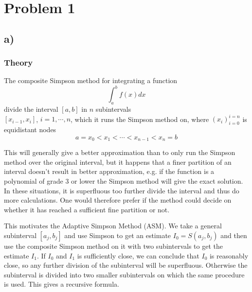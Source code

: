 \documentclass[12pt, a4paper,usenames,dvipsnames]{article}
\begin{document}
\section*{Problem 1}
\subsection*{a)}
\subsubsection*{Theory}
The composite Simpson method for integrating a function 
\[\int_a^bf(x)dx\] 
divide the interval \([a,b]\) in \(n\) subintervals\\ \([x_{i-1},x_i]\), \(i=1,\cdots,n\), which it runs the Simpson method on, where \((x_i)_{i=0}^{i=n}\) is equidistant nodes \[a=x_0<x_1<\cdots<x_{n-1}<x_n=b\]

This will generally give a better approximation than to only run the Simpson method over the original interval, but it happens that a finer partition of an interval doesn't result in better approximation, e.g. if the function is a polynomial of grade 3 or lower the Simpson method will give the exact solution. In these situations, it is superfluous too further divide the interval and thus do more calculations. One would therefore prefer if the method could decide on whether it has reached a sufficient fine partition or not.

This motivates the Adaptive Simpson Method (ASM). We take a general subinterval \([a_j,b_j]\) and use Simpson to get an estimate \(I_0=S(a_j,b_j)\) and then use the composite Simpson method on it with two subintervals to get the estimate \(I_1\). If \(I_0\) and \(I_1\) is sufficiently close, we can conclude that \(I_0\) is reasonably close, so any further division of the subinterval will be superfluous. Otherwise the subinterval is divided into two smaller subintervals on which the same procedure is used. This gives a recursive formula. 
\end{document}
